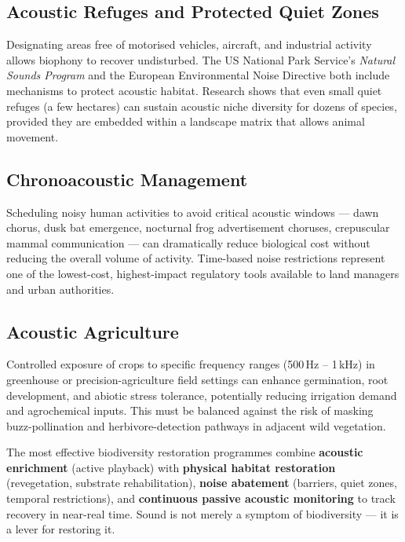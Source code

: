 \documentclass[12pt, a4paper]{article}
\begin{document}
\subsection{Acoustic Refuges and Protected Quiet Zones}

Designating areas free of motorised vehicles, aircraft, and industrial activity allows biophony
to recover undisturbed. The US National Park Service's \textit{Natural Sounds Program} and the
European Environmental Noise Directive both include mechanisms to protect acoustic habitat.
Research shows that even small quiet refuges (a few hectares) can sustain acoustic niche
diversity for dozens of species, provided they are embedded within a landscape matrix that
allows animal movement.

\subsection{Chronoacoustic Management}

Scheduling noisy human activities to avoid critical acoustic windows --- dawn chorus, dusk bat
emergence, nocturnal frog advertisement choruses, crepuscular mammal communication --- can
dramatically reduce biological cost without reducing the overall volume of activity. Time-based
noise restrictions represent one of the lowest-cost, highest-impact regulatory tools available
to land managers and urban authorities.

\subsection{Acoustic Agriculture}

Controlled exposure of crops to specific frequency ranges (500\,Hz -- 1\,kHz) in greenhouse or
precision-agriculture field settings can enhance germination, root development, and abiotic
stress tolerance, potentially reducing irrigation demand and agrochemical inputs. This must be
balanced against the risk of masking buzz-pollination and herbivore-detection pathways in
adjacent wild vegetation.

\begin{greenbox}[title=Emerging Consensus]
The most effective biodiversity restoration programmes combine \textbf{acoustic enrichment}
(active playback) with \textbf{physical habitat restoration} (revegetation, substrate
rehabilitation), \textbf{noise abatement} (barriers, quiet zones, temporal restrictions), and
\textbf{continuous passive acoustic monitoring} to track recovery in near-real time.
Sound is not merely a symptom of biodiversity --- it is a lever for restoring it.
\end{greenbox}
\end{document}
